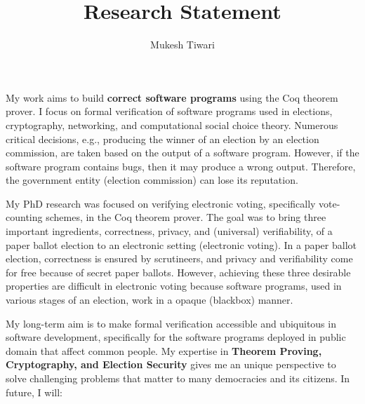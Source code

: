 \documentclass[a4paper]{article}
\title{Research Statement}
\author{Mukesh Tiwari}
\date{}
\begin{document}
\fontsize{12}{15}
\selectfont
\maketitle


My work aims to build \textbf{correct software programs} 
using the Coq theorem prover. 
I focus on formal verification of software programs used in elections, cryptography, 
networking, and computational social choice theory. Numerous critical decisions, e.g., 
producing the winner of an election by an election commission,
are taken based on the output of a software program. However, if the
software program contains bugs, then it may produce a wrong 
output. Therefore, the government entity (election commission) can 
lose its reputation.  

My PhD research was focused on verifying electronic voting, specifically vote-counting schemes, in 
the Coq theorem prover. The goal was to 
bring  three important ingredients, correctness, privacy, and (universal) verifiability, of a paper ballot election to 
an electronic setting (electronic voting). In a paper ballot election, correctness is
ensured by scrutineers, and privacy and verifiability  
come for free because of secret paper ballots.  However, achieving these three desirable properties 
are difficult in 
electronic voting because software programs, used in 
various stages of an election, work in a opaque (blackbox) manner. 


My long-term aim is to make formal verification accessible and ubiquitous in 
software development, specifically for the software programs deployed in public domain
that affect common people.
My expertise in \textbf{Theorem Proving, Cryptography, and Election Security}
gives me an unique perspective to solve challenging problems that matter to many democracies 
and its citizens. In future, I will:
\end{document}

